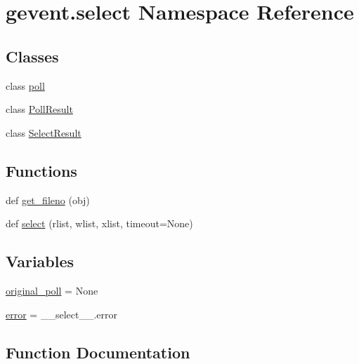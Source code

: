 \hypertarget{namespacegevent_1_1select}{}\section{gevent.\+select Namespace Reference}
\label{namespacegevent_1_1select}
\subsection*{Classes}
\begin{DoxyCompactItemize}
\item 
class \hyperlink{classgevent_1_1select_1_1poll}{poll}
\item 
class \hyperlink{classgevent_1_1select_1_1_poll_result}{Poll\+Result}
\item 
class \hyperlink{classgevent_1_1select_1_1_select_result}{Select\+Result}
\end{DoxyCompactItemize}
\subsection*{Functions}
\begin{DoxyCompactItemize}
\item 
def \hyperlink{namespacegevent_1_1select_a0ae62b44096d88ce75c2173a7f8b647d}{get\+\_\+fileno} (obj)
\item 
def \hyperlink{namespacegevent_1_1select_aa001b4b6ecde28467c1e0c9329d8418d}{select} (rlist, wlist, xlist, timeout=None)
\end{DoxyCompactItemize}
\subsection*{Variables}
\begin{DoxyCompactItemize}
\item 
\hyperlink{namespacegevent_1_1select_ad7314893f8d66c09953f9beb27f30056}{original\+\_\+poll} = None
\item 
\hyperlink{namespacegevent_1_1select_a08385e621115d5284edb3890ea2a82af}{error} = \+\_\+\+\_\+select\+\_\+\+\_\+.\+error
\end{DoxyCompactItemize}


\subsection{Function Documentation}
\mbox{\label{namespacegevent_1_1select_a0ae62b44096d88ce75c2173a7f8b647d}} 
